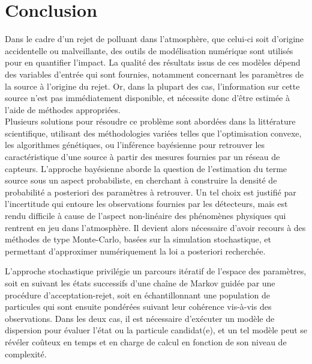 \chapter{Conclusion}

Dans le cadre d'un rejet de polluant dans l'atmosphère, que celui-ci soit d'origine accidentelle ou malveillante, des outils de modélisation numérique sont utilisés pour en quantifier l'impact. La qualité des résultats issus de ces modèles dépend des variables d'entrée qui sont fournies, notamment concernant les paramètres de la source à l'origine du rejet. Or, dans la plupart des cas, l'information sur cette source n'est pas immédiatement disponible, et nécessite donc d'être estimée à l'aide de méthodes appropriées. \\

Plusieurs solutions pour résoudre ce problème sont abordées dans la littérature scientifique, utilisant des méthodologies variées telles que l'optimisation convexe, les algorithmes génétiques, ou l'inférence bayésienne pour retrouver les caractéristique d'une source à partir des mesures fournies par un réseau de capteurs. L'approche bayésienne aborde la question de l'estimation du terme source sous un aspect probabiliste, en cherchant à construire la densité de probabilité a posteriori des paramètres à retrouver. Un tel choix est justifié par l'incertitude qui entoure les observations fournies par les détecteurs, mais est rendu difficile à cause de l'aspect non-linéaire des phénomènes physiques qui rentrent en jeu dans l'atmosphère. Il devient alors nécessaire d'avoir recours à des méthodes de type Monte-Carlo, basées sur la simulation stochastique, et permettant d'approximer numériquement la loi a posteriori recherchée. \\


L'approche stochastique privilégie un parcours itératif de l'espace des paramètres, soit en suivant les états successifs d'une chaîne de Markov guidée par une procédure d'acceptation-rejet, soit en échantillonnant une population de particules qui sont ensuite pondérées suivant leur cohérence vis-à-vis des observations. Dans les deux cas, il est nécessaire d'exécuter un modèle de dispersion pour évaluer l'état ou la particule candidat(e), et un tel modèle peut se révéler coûteux en temps et en charge de calcul en fonction de son niveau de complexité. \\

